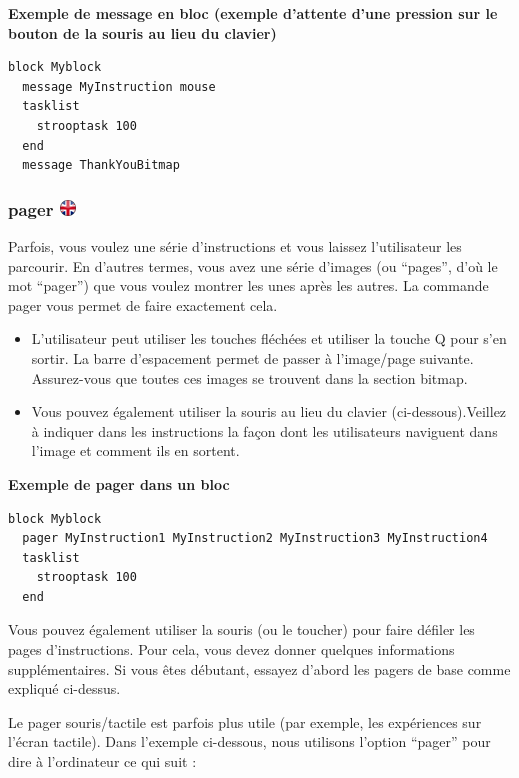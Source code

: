 \documentclass[
]{book}
\providecommand{\tightlist}{%
  \setlength{\itemsep}{0pt}\setlength{\parskip}{0pt}}
\begin{document}
\textbf{Exemple de message en bloc (exemple d'attente d'une pression sur
le bouton de la souris au lieu du clavier)}

\begin{verbatim}
block Myblock
  message MyInstruction mouse
  tasklist
    strooptask 100
  end
  message ThankYouBitmap
\end{verbatim}

\hypertarget{pager}{%
\subsubsection[pager ]{\texorpdfstring{pager
\href{https://www.psytoolkit.org/doc3.2.0/syntax.html\#block-pager}{\protect\includegraphics{img/ukflag.png}}}{pager }}\label{pager}}

Parfois, vous voulez une série d'instructions et vous laissez
l'utilisateur les parcourir. En d'autres termes, vous avez une série
d'images (ou ``pages'', d'où le mot ``pager'') que vous voulez montrer
les unes après les autres. La commande pager vous permet de faire
exactement cela.

\begin{itemize}
\tightlist
\item
  L'utilisateur peut utiliser les touches fléchées et utiliser la touche
  Q pour s'en sortir. La barre d'espacement permet de passer à
  l'image/page suivante. Assurez-vous que toutes ces images se trouvent
  dans la section bitmap.
\item
  Vous pouvez également utiliser la souris au lieu du clavier
  (ci-dessous).Veillez à indiquer dans les instructions la façon dont
  les utilisateurs naviguent dans l'image et comment ils en sortent.
\end{itemize}

\textbf{Exemple de pager dans un bloc}

\begin{verbatim}
block Myblock
  pager MyInstruction1 MyInstruction2 MyInstruction3 MyInstruction4
  tasklist
    strooptask 100
  end
\end{verbatim}

Vous pouvez également utiliser la souris (ou le toucher) pour faire
défiler les pages d'instructions. Pour cela, vous devez donner quelques
informations supplémentaires. Si vous êtes débutant, essayez d'abord les
pagers de base comme expliqué ci-dessus.

Le pager souris/tactile est parfois plus utile (par exemple, les
expériences sur l'écran tactile). Dans l'exemple ci-dessous, nous
utilisons l'option ``pager'' pour dire à l'ordinateur ce qui suit :
\end{document}
